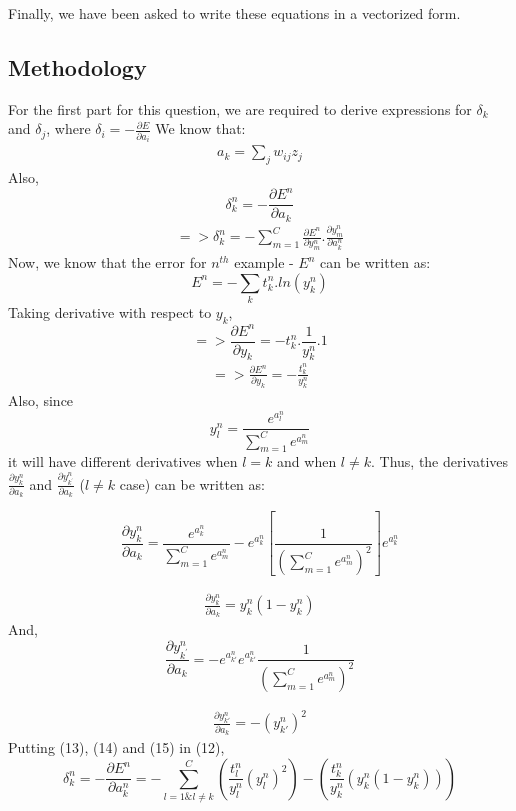 \documentclass{article}
\begin{document}
Finally, we have been asked to write these equations in a vectorized form.

\subsection{Methodology}
For the first part for this question, we are required to derive expressions for $\delta_k$ and $\delta_j$, where $\delta_i = - \frac{\partial E}{\partial a_{i}}$
We know that:
\begin{align}
a_k = \sum_{j} w_{ij}z_{j}
\end{align}
Also, 
$$
\delta_{k}^n = -\frac{\partial E^n}{\partial a_{k}}$$
\begin{align}
=> \delta_{k}^n = -\sum_{m=1}^C \frac{\partial E^n}{\partial y_{m}^n}.\frac{\partial y_{m}^n}{\partial a_{k}^n}
\end{align}
Now, we know that the error for $n^{th}$ example - $E^n$ can be written as:
$$E^n = - \sum_k t_k^n.ln(y_k^n)$$
Taking derivative with respect to $y_k$,
$$=> \frac{\partial E^n}{\partial y_{k}} = -t_k^n.\frac{1}{y_k^n}.1$$
\begin{align}
=> \frac{\partial E^n}{\partial y_{k}} = -\frac{t_k^n}{y_k^n}
\end{align}
Also, since $$y_{l}^{n} = \frac{e^{a_l^n}}{\sum_{m=1}^{C} e^{a_m^n}}$$ it will have different derivatives when $l = k$ and when $l \neq k$. Thus, the derivatives $\frac{\partial y_{k}^{n}}{\partial a_{k}}$ and $\frac{\partial y_{k^{'}}^{n}}{\partial a_{k}}$ ($l \neq k$ case) can be written as:

$$\frac{\partial y_{k}^{n}}{\partial a_{k}} = \frac{e^{a_k^n}}{\sum_{m=1}^{C} e^{a_m^n}} - e^{a_k^n} \left[ \frac{1}{(\sum_{m=1}^{C} e^{a_m^n})^{2}} \right] e^{a_k^n}$$

\begin{align}
\frac{\partial y_{k}^{n}}{\partial a_{k}} = y_{k}^{n}(1 - y_{k}^{n})
\end{align}
And,
$$\frac{\partial y_{k^{'}}^{n}}{\partial a_{k}} = - e^{a_{k'}^n} e^{a_{k'}^n} \frac{1}{(\sum_{m=1}^{C} e^{a_m^n})^{2}} $$

\begin{align}
\frac{\partial y_{k'}^{n}}{\partial a_{k}} = - (y_{k'}^{n})^{2}
\end{align}
Putting (13), (14) and (15) in (12),
$$\delta_{k}^n = - \frac{\partial E^{n}}{\partial a_{k}^{n}} = -\sum_{l=1 \& l \neq k}^{C} (\frac{t_l^{n}}{y_l^{n}} (y_{l}^{n})^{2}) - (\frac{t_k^{n}}{y_k^{n}} (y_{k}^{n}(1 - y_{k}^{n})))$$ 
\end{document}
